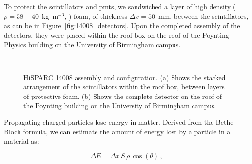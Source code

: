 To protect the scintillators and \glspl{pmt}, we sandwiched a layer of high density ($\rho = 38-40$~kg~m$^{-3}$, \citet{efoam_sf38_2017}) foam, of thickness $\Delta x = 50$~mm, between the scintillators, as can be in Figure~\ref{fig:14008_detectors}. Upon the completed assembly of the detectors, they were placed within the roof box on the roof of the Poynting Physics building on the University of Birmingham campus.


\begin{figure}[ht!]
	\centering
	 \\
	
	\caption{HiSPARC 14008 assembly and configuration. (a) Shows the stacked arrangement of the scintillators within the roof box, between layers of protective foam. (b) Shows the complete detector on the roof of the Poynting building on the University of Birmingham campus.}
	\label{fig:HS_14008_setup}
\end{figure}


Propagating charged particles lose energy in matter. Derived from the Bethe-Bloch formula, we can estimate the amount of energy lost by a particle in a material as:

\begin{equation}
\Delta E = \Delta x \, S \, \rho \, \cos(\theta) \, ,
\label{eq:energy_loss}
\end{equation}

